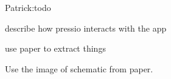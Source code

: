 Patrick\+:todo
\begin{DoxyItemize}
\item describe how pressio interacts with the app
\item use paper to extract things
\end{DoxyItemize}

Use the image of schematic from paper. 